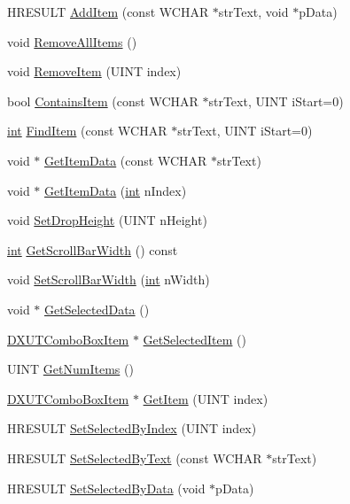 \begin{DoxyCompactItemize}
\item 
HRESULT \hyperlink{class_c_d_x_u_t_combo_box_aa444c95e8c96e0e16a5184de95cd3bd9}{AddItem} (const WCHAR $\ast$strText, void $\ast$pData)
\item 
void \hyperlink{class_c_d_x_u_t_combo_box_a8554b7a381480a1698e283908bb3ebcc}{RemoveAllItems} ()
\item 
void \hyperlink{class_c_d_x_u_t_combo_box_aa2b97d66478fa689d7e05d0e84f227b6}{RemoveItem} (UINT index)
\item 
bool \hyperlink{class_c_d_x_u_t_combo_box_a1f2a004f544f4ce18603688572594967}{ContainsItem} (const WCHAR $\ast$strText, UINT iStart=0)
\item 
\hyperlink{_d_x_u_tgui_8cpp_a2d77ed03302b6978834ee3b6f57837fb}{int} \hyperlink{class_c_d_x_u_t_combo_box_acb2d98d5fa0b8f9984f253dffaea2318}{FindItem} (const WCHAR $\ast$strText, UINT iStart=0)
\item 
void $\ast$ \hyperlink{class_c_d_x_u_t_combo_box_a25cd3ea3c6094505c29ca6bf2c90d4af}{GetItemData} (const WCHAR $\ast$strText)
\item 
void $\ast$ \hyperlink{class_c_d_x_u_t_combo_box_a93938cc0dcad77883818800ff4c68e5e}{GetItemData} (\hyperlink{_d_x_u_tgui_8cpp_a2d77ed03302b6978834ee3b6f57837fb}{int} nIndex)
\item 
void \hyperlink{class_c_d_x_u_t_combo_box_a1ace87e91be7ab78d7367e99f1788952}{SetDropHeight} (UINT nHeight)
\item 
\hyperlink{_d_x_u_tgui_8cpp_a2d77ed03302b6978834ee3b6f57837fb}{int} \hyperlink{class_c_d_x_u_t_combo_box_a47644eab0287801bf65a37fe9c03989b}{GetScrollBarWidth} () const 
\item 
void \hyperlink{class_c_d_x_u_t_combo_box_a88c5c2c892f239357443fc6b3b37c40d}{SetScrollBarWidth} (\hyperlink{_d_x_u_tgui_8cpp_a2d77ed03302b6978834ee3b6f57837fb}{int} nWidth)
\item 
void $\ast$ \hyperlink{class_c_d_x_u_t_combo_box_abaf5f86c0e1f652aa1f71a8cbc63122a}{GetSelectedData} ()
\item 
\hyperlink{struct_d_x_u_t_combo_box_item}{DXUTComboBoxItem} $\ast$ \hyperlink{class_c_d_x_u_t_combo_box_a99d3048050a0e6934ecc6140d350f222}{GetSelectedItem} ()
\item 
UINT \hyperlink{class_c_d_x_u_t_combo_box_a4706b4e1da4030d3107b76885a27e3e9}{GetNumItems} ()
\item 
\hyperlink{struct_d_x_u_t_combo_box_item}{DXUTComboBoxItem} $\ast$ \hyperlink{class_c_d_x_u_t_combo_box_a2235c56b715f74aea5aa175cf0a8caa8}{GetItem} (UINT index)
\item 
HRESULT \hyperlink{class_c_d_x_u_t_combo_box_aa4b0062f2e1a3a01c2fcc63a652482ef}{SetSelectedByIndex} (UINT index)
\item 
HRESULT \hyperlink{class_c_d_x_u_t_combo_box_a6efbd6c0b3cbd66389ad21e25e5fbb14}{SetSelectedByText} (const WCHAR $\ast$strText)
\item 
HRESULT \hyperlink{class_c_d_x_u_t_combo_box_a66f4a4f8a88f37f0719942b7eac7fed8}{SetSelectedByData} (void $\ast$pData)
\end{DoxyCompactItemize}
